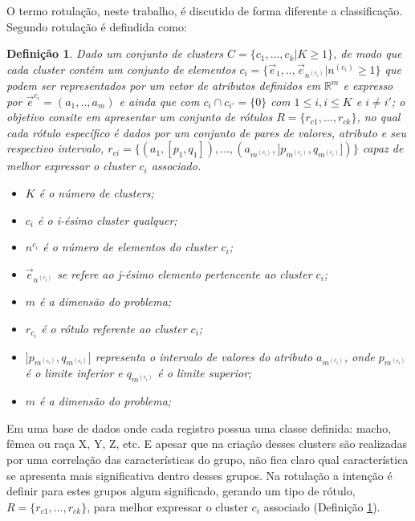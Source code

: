 O termo rotulação, neste trabalho, é discutido de forma diferente a classificação. Segundo  rotulação é defindida como: 
\newtheorem{defprobLopes}{Definição}
    \begin{defprobLopes}
    Dado um conjunto de clusters ${C=\{c_1,...,c_k | K \geqslant 1\} }$, de modo que cada cluster contém um conjunto de elementos ${c_i=\{\vec{e}_1,..,\vec{e}_{n^{(c_i)}}|n^{(c_i)} \geqslant 1 \}}$ que podem ser representados por um vetor de atributos definidos em ${\mathbb{R}^m }$ e expresso por ${ \vec{e}^{c_i}=(a_1,..,a_m)  }$ e ainda que  com ${ c_i \cap c_{i'}=\{0\} }$ com ${ 1 \leqslant i, i \leqslant K  }$ e ${ i \neq i' }$; o objetivo consite em apresentar um conjunto de rótulos ${ R=\{ r_{c1},...,r_{ck} \} }$, no qual cada rótulo específico é dados por um conjunto de pares de valores, atributo e seu respectivo intervalo, ${ r_{ci}=\{ (a_1,[p_1,q_1]),...,(a_{m^{(c_i)}}, ]p_{m^{(c_i)}},q_{m^{(c_i)}}]) \} }$ capaz de melhor expressar o cluster ${c_i}$ associado.
        \footnotemark 
        \begin{itemize}[noitemsep]
            \item ${K}$ é o número de clusters;
            \item ${c_i}$ é o i-ésimo cluster qualquer;
            \item ${n^{c_i}}$ é o número de elementos do cluster ${c_i}$;
            \item ${\vec{e}_{n^{(c_i)}}}$ se refere ao j-ésimo elemento pertencente ao cluster ${c_i}$;
            \item ${m}$ é a dimensão do problema;
            \item ${r_{c_i}}$ é o rótulo referente ao cluster ${c_i}$;
            \item ${]p_{m^{(c_i)}},q_{m^{(c_i)}}]}$ representa o intervalo de valores do atributo ${a_{m^{(c_i)}} }$, onde ${ p_{m^{(c_i)}} }$  é o limite inferior e ${ q_{m^{(c_i)}} }$ é o limite superior;
            \item ${m}$ é a dimensão do problema;
        \end{itemize}
    \label{teo:lopes:problema}
    \end{defprobLopes}

Em uma base de dados onde cada registro possua uma classe definida: macho, fêmea ou raça X, Y, Z, etc. E apesar que na criação desses clusters são realizadas por uma correlação das características do grupo, não fica claro qual característica se apresenta mais significativa dentro desses grupos. Na rotulação a intenção é definir para estes grupos algum significado, gerando um tipo de rótulo, ${ R=\{ r_{c1},...,r_{ck} \} }$, para melhor expressar o cluster ${c_i}$ associado (Definição \ref{teo:lopes:problema}).

